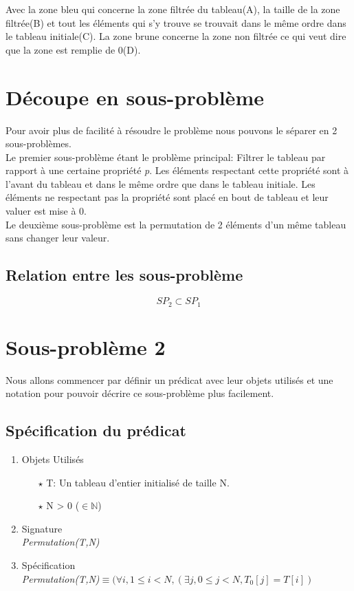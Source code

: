 \documentclass[a4paper, 11pt, oneside]{article}
\begin{document}
    Avec la zone {\color[HTML]{3531FF}bleu} qui concerne la zone filtrée du tableau(A), la taille de la zone filtrée(B) et tout les éléments qui s'y trouve se trouvait dans le même ordre dans le tableau initiale(C). La zone {\color[HTML]{9A0000} brune} concerne la zone non filtrée ce qui veut dire que la zone est remplie de 0(D).

\section{Découpe en sous-problème}

    Pour avoir plus de facilité à résoudre le problème nous pouvons le séparer en 2 sous-problèmes.\\
    Le premier sous-problème étant le problème principal: Filtrer le tableau par rapport à une certaine propriété \textit{p}.
    Les éléments respectant cette propriété sont à l'avant du tableau et dans le même ordre que dans le tableau initiale.
    Les éléments ne respectant pas la propriété sont placé en bout de tableau et leur valuer est mise à 0.\\
    Le deuxième sous-problème est la permutation de 2 éléments d'un même tableau sans changer leur valeur.

    \subsection{Relation entre les sous-problème}

    \[
        SP_2 \subset SP_1
    \]
\section{Sous-problème 2}
    Nous allons commencer par définir un prédicat avec leur objets utilisés et une notation
    pour pouvoir décrire ce sous-problème plus facilement.

    \subsection{Spécification du prédicat}

        \begin{enumerate}
            \item Objets Utilisés
                \begin{itemize}
                    \item[$\star$] T: Un tableau d'entier initialisé de taille N.
                    \item[$\star$] N > 0 ($\in \mathbb{N}$)
                \end{itemize}

            \item Signature \\
                \textit{Permutation(T,N)}

            \item Spécification\\
                \textit{Permutation(T,N)}$\equiv (\forall i, 1\leq i < N, (\exists j, 0\leq j < N, T_0[j] = T[i])$
        \end{enumerate}
\end{document}
